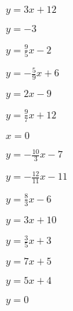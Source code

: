 \begin{esercizio}\label{ese:}
 \begin{multicols}{3}
 \begin{enumeratea}
  \item  $y = 3 x +12$
  \item  $y = -3$
  \item  $y = \frac{9}{5} x -2$
 \end{enumeratea}
 \end{multicols}
\end{esercizio}

\begin{esercizio}\label{ese:}
 \begin{multicols}{3}
 \begin{enumeratea}
  \item  $y = -\frac{5}{9} x +6$
  \item  $y = 2 x -9$
  \item  $y = \frac{9}{7} x +12$
 \end{enumeratea}
 \end{multicols}
\end{esercizio}

\begin{esercizio}\label{ese:}
 \begin{multicols}{3}
 \begin{enumeratea}
  \item  $x = 0$
  \item  $y = -\frac{10}{3} x -7$
  \item  $y = -\frac{12}{11} x -11$
 \end{enumeratea}
 \end{multicols}
\end{esercizio}

\begin{esercizio}\label{ese:}
 \begin{multicols}{3}
 \begin{enumeratea}
  \item  $y = \frac{8}{3} x -6$
  \item  $y = 3 x +10$
  \item  $y = \frac{3}{5} x +3$
 \end{enumeratea}
 \end{multicols}
\end{esercizio}

\begin{esercizio}\label{ese:}
 \begin{multicols}{3}
 \begin{enumeratea}
  \item  $y = 7 x +5$
  \item  $y = 5 x +4$
  \item  $y = 0$
 \end{enumeratea}
 \end{multicols}
\end{esercizio}

